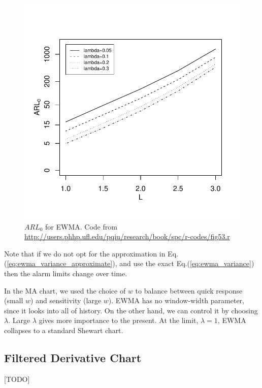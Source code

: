 \begin{figure}[h]
\centering
\includegraphics[height=0.3\textheight]{art/fig53}
\caption[$ARL_0$ for EWMA]{$ARL_0$ for EWMA. \newline Code from \url{http://users.phhp.ufl.edu/pqiu/research/book/spc/r-codes/fig53.r}}
\label{fig:arl_0_ewma}
\end{figure}

Note that if we do not opt for the approximation in Eq.(\ref{eq:ewma_variance_approximate}), and use the exact Eq.(\ref{eq:ewma_variance}) then the alarm limits change over time. 


In the MA chart, we used the choice of $w$ to balance between quick response (small $w$) and sensitivity (large $w$).
EWMA has no window-width parameter, since it looks into all of history. On the other hand, we can control it by choosing $\lambda$. 
Large $\lambda$ gives more importance to the present. At the limit, $\lambda=1$, EWMA collapses to a standard Shewart chart.







\subsection{Filtered Derivative Chart}
[TODO]


